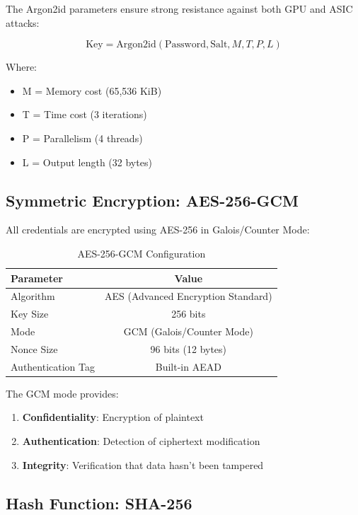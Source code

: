 \documentclass[12pt,a4paper]{report}
\begin{document}
The Argon2id parameters ensure strong resistance against both GPU and ASIC attacks:

\[
\text{Key} = \text{Argon2id}(\text{Password}, \text{Salt}, M, T, P, L)
\]

Where:
\begin{itemize}
    \item M = Memory cost (65,536 KiB)
    \item T = Time cost (3 iterations)
    \item P = Parallelism (4 threads)
    \item L = Output length (32 bytes)
\end{itemize}

\subsection{Symmetric Encryption: AES-256-GCM}

All credentials are encrypted using AES-256 in Galois/Counter Mode:

\begin{table}[H]
\centering
\begin{tabular}{|l|c|}
\hline
\textbf{Parameter} & \textbf{Value} \\
\hline
Algorithm & AES (Advanced Encryption Standard) \\
Key Size & 256 bits \\
Mode & GCM (Galois/Counter Mode) \\
Nonce Size & 96 bits (12 bytes) \\
Authentication Tag & Built-in AEAD \\
\hline
\end{tabular}
\caption{AES-256-GCM Configuration}
\end{table}

The GCM mode provides:
\begin{enumerate}
    \item \textbf{Confidentiality}: Encryption of plaintext
    \item \textbf{Authentication}: Detection of ciphertext modification
    \item \textbf{Integrity}: Verification that data hasn't been tampered
\end{enumerate}

\subsection{Hash Function: SHA-256}
\end{document}
